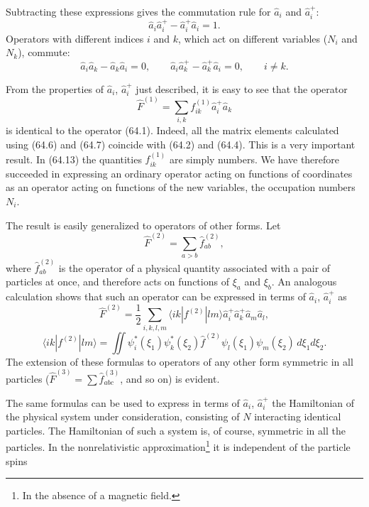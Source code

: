 Subtracting these expressions gives the commutation rule for $\hat a_i$ and $\hat a_i^+$:
\begin{equation}
 \hat a_i\hat a_i^+-\hat a_i^+\hat a_i=1.
 \tag{64.11}
\end{equation}
Operators with different indices $i$ and $k$, which act on different variables ($N_i$ and $N_k$), commute:
\begin{equation}
 \hat a_i\hat a_k-\hat a_k\hat a_i=0,\qquad
 \hat a_i\hat a_k^+-\hat a_k^+\hat a_i=0,\qquad i\ne k.
 \tag{64.12}
\end{equation}

From the properties of $\hat a_i$, $\hat a_i^+$ just described, it is easy to see that the operator
\begin{equation}
 \hat F^{(1)}=\sum_{i,k}f_{ik}^{(1)}\hat a_i^+\hat a_k
 \tag{64.13}
\end{equation}
is identical to the operator (64.1). Indeed, all the matrix elements calculated using (64.6) and (64.7) coincide with (64.2) and (64.4). This is a very important result. In (64.13) the quantities $f_{ik}^{(1)}$ are simply numbers. We have therefore succeeded in expressing an ordinary operator acting on functions of coordinates as an operator acting on functions of the new variables, the occupation numbers $N_i$.

The result is easily generalized to operators of other forms. Let
\begin{equation}
 \hat F^{(2)}=\sum_{a>b}\hat f_{ab}^{(2)},
 \tag{64.14}
\end{equation}
where $\hat f_{ab}^{(2)}$ is the operator of a physical quantity associated with a pair of particles at once, and therefore acts on functions of $\xi_a$ and $\xi_b$. An analogous calculation shows that such an operator can be expressed in terms of $\hat a_i$, $\hat a_i^+$ as
\begin{equation}
 \hat F^{(2)}=\frac12\sum_{i,k,l,m}
 \langle ik|f^{(2)}|lm\rangle\hat a_i^+\hat a_k^+\hat a_m\hat a_l,
 \tag{64.15}
\end{equation}
\[
 \langle ik|f^{(2)}|lm\rangle=\iint
 \psi_i^*(\xi_1)\psi_k^*(\xi_2)\hat f^{(2)}
 \psi_l(\xi_1)\psi_m(\xi_2)\,d\xi_1d\xi_2.
\]
The extension of these formulas to operators of any other form symmetric in all particles ($\hat F^{(3)}=\sum\hat f_{abc}^{(3)}$, and so on) is evident.

The same formulas can be used to express in terms of $\hat a_i$, $\hat a_i^+$ the Hamiltonian of the physical system under consideration, consisting of $N$ interacting identical particles. The Hamiltonian of such a system is, of course, symmetric in all the particles. In the nonrelativistic approximation\footnote{In the absence of a magnetic field.} it is independent of the particle spins


